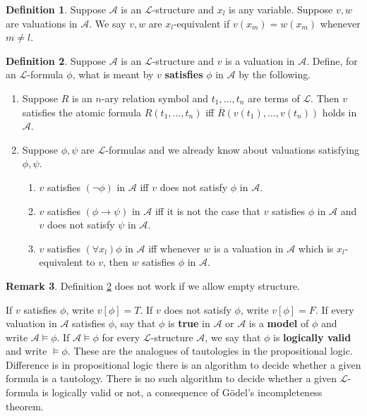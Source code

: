 \documentclass{article}
\newcommand{\rb}[1]{\left( #1 \right)}
\renewcommand{\sb}[1]{\left[ #1 \right]}
\newcommand{\notb}[1]{\rb{\neg #1}}
\newcommand{\impb}[2]{\rb{#1 \rightarrow #2}}
\newcommand{\fab}[1]{\rb{\forall #1}}
\theoremstyle{definition}\newtheorem{definition}{Definition}[subsection]
\theoremstyle{definition}\newtheorem{remark}[definition]{Remark}
\theoremstyle{definition}\newtheorem*{example}{Example}
\theoremstyle{definition}\newtheorem*{note}{Note}
\begin{document}
\begin{definition}
Suppose $ \mathcal{A} $ is an $ \mathcal{L} $-structure and $ x_l $ is any variable. Suppose $ v, w $ are valuations in $ \mathcal{A} $. We say $ v, w $ are $ x_l $-equivalent if $ v\rb{x_m} = w\rb{x_m} $ whenever $ m \ne l $.
\end{definition}

\begin{definition}
\label{def:2.2.9}
Suppose $ \mathcal{A} $ is an $ \mathcal{L} $-structure and $ v $ is a valuation in $ \mathcal{A} $. Define, for an $ \mathcal{L} $-formula $ \phi $, what is meant by $ v $ \textbf{satisfies} $ \phi $ in $ \mathcal{A} $ by the following.
\begin{enumerate}
\item Suppose $ R $ is an $ n $-ary relation symbol and $ t_1, \dots, t_n $ are terms of $ \mathcal{L} $. Then $ v $ satisfies the atomic formula $ R\rb{t_1, \dots, t_n} $ iff $ \overline{R}\rb{v\rb{t_1}, \dots, v\rb{t_n}} $ holds in $ \mathcal{A} $.
\item Suppose $ \phi, \psi $ are $ \mathcal{L} $-formulas and we already know about valuations satisfying $ \phi, \psi $.
\begin{enumerate}
\item $ v $ satisfies $ \notb{\phi} $ in $ \mathcal{A} $ iff $ v $ does not satisfy $ \phi $ in $ \mathcal{A} $.
\item $ v $ satisfies $ \impb{\phi}{\psi} $ in $ \mathcal{A} $ iff it is not the case that $ v $ satisfies $ \phi $ in $ \mathcal{A} $ and $ v $ does not satisfy $ \psi $ in $ \mathcal{A} $.
\item $ v $ satisfies $ \fab{x_l}\phi $ in $ \mathcal{A} $ iff whenever $ w $ is a valuation in $ \mathcal{A} $ which is $ x_l $-equivalent to $ v $, then $ w $ satisfies $ \phi $ in $ \mathcal{A} $.
\end{enumerate}
\end{enumerate}
\end{definition}


\begin{remark}
Definition \ref{def:2.2.9} does not work if we allow empty structure.
\end{remark}

If $ v $ satisfies $ \phi $, write $ v\sb{\phi} = T $. If $ v $ does not satisfy $ \phi $, write $ v\sb{\phi} = F $. If every valuation in $ \mathcal{A} $ satisfies $ \phi $, say that $ \phi $ is \textbf{true} in $ \mathcal{A} $ or $ \mathcal{A} $ is a \textbf{model} of $ \phi $ and write $ \mathcal{A} \vDash \phi $. If $ \mathcal{A} \vDash \phi $ for every $ \mathcal{L} $-structure $ \mathcal{A} $, we say that $ \phi $ is \textbf{logically valid} and write $ \vDash \phi $. These are the analogues of tautologies in the propositional logic. Difference is in propositional logic there is an algorithm to decide whether a given formula is a tautology. There is no such algorithm to decide whether a given $ \mathcal{L} $-formula is logically valid or not, a consequence of Gödel's incompleteness theorem.
\end{document}
